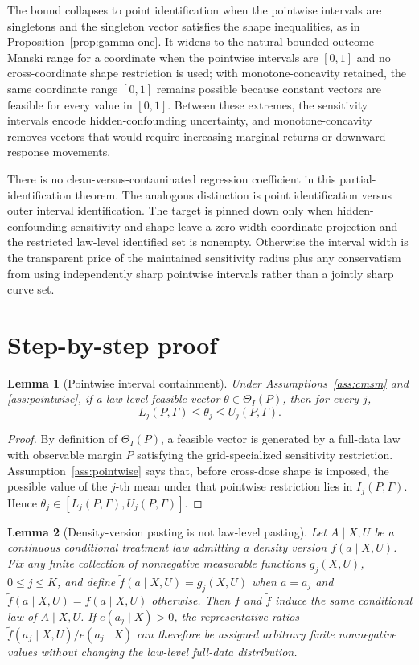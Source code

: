 \documentclass[11pt]{article}
\theoremstyle{definition}
\theoremstyle{plain}
\newtheorem{lemma}{Lemma}
\theoremstyle{remark}
\begin{document}
The bound collapses to point identification when the pointwise intervals are singletons and the singleton vector satisfies the shape inequalities, as in Proposition~\ref{prop:gamma-one}.  It widens to the natural bounded-outcome Manski range for a coordinate when the pointwise intervals are \([0,1]\) and no cross-coordinate shape restriction is used; with monotone-concavity retained, the same coordinate range \([0,1]\) remains possible because constant vectors are feasible for every value in \([0,1]\).  Between these extremes, the sensitivity intervals encode hidden-confounding uncertainty, and monotone-concavity removes vectors that would require increasing marginal returns or downward response movements.

There is no clean-versus-contaminated regression coefficient in this partial-identification theorem.  The analogous distinction is point identification versus outer interval identification.  The target is pinned down only when hidden-confounding sensitivity and shape leave a zero-width coordinate projection and the restricted law-level identified set is nonempty.  Otherwise the interval width is the transparent price of the maintained sensitivity radius plus any conservatism from using independently sharp pointwise intervals rather than a jointly sharp curve set.

\section{Step-by-step proof}
\begin{lemma}[Pointwise interval containment]\label{lem:pointwise-realization}
Under Assumptions~\ref{ass:cmsm} and \ref{ass:pointwise}, if a law-level feasible vector \(\theta\in\Theta_I(P)\), then for every \(j\),
\[
  L_j(P,\Gamma)\le \theta_j\le U_j(P,\Gamma).
\]
\end{lemma}

\begin{proof}
By definition of \(\Theta_I(P)\), a feasible vector is generated by a full-data law with observable margin \(P\) satisfying the grid-specialized sensitivity restriction.  Assumption~\ref{ass:pointwise} says that, before cross-dose shape is imposed, the possible value of the \(j\)-th mean under that pointwise restriction lies in \(I_j(P,\Gamma)\).  Hence \(\theta_j\in[L_j(P,\Gamma),U_j(P,\Gamma)]\).
\end{proof}

\begin{lemma}[Density-version pasting is not law-level pasting]\label{lem:pasting}
Let \(A\mid X,U\) be a continuous conditional treatment law admitting a density version \(f(a\mid X,U)\).  Fix any finite collection of nonnegative measurable functions \(g_j(X,U)\), \(0\le j\le K\), and define \(\tilde f(a\mid X,U)=g_j(X,U)\) when \(a=a_j\) and \(\tilde f(a\mid X,U)=f(a\mid X,U)\) otherwise.  Then \(f\) and \(\tilde f\) induce the same conditional law of \(A\mid X,U\).  If \(e(a_j\mid X)>0\), the representative ratios \(\tilde f(a_j\mid X,U)/e(a_j\mid X)\) can therefore be assigned arbitrary finite nonnegative values without changing the law-level full-data distribution.
\end{lemma}
\end{document}
